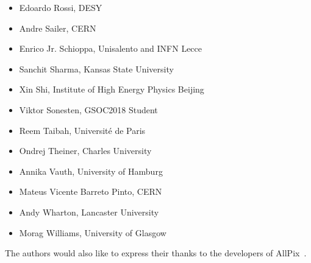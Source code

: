 \begin{itemize}
\item Edoardo Rossi, DESY
\item Andre Sailer, CERN
\item Enrico Jr. Schioppa, Unisalento and INFN Lecce
\item Sanchit Sharma, Kansas State University
\item Xin Shi, Institute of High Energy Physics Beijing
\item Viktor Sonesten, GSOC2018 Student
\item Reem Taibah, Université de Paris
\item Ondrej Theiner, Charles University
\item Annika Vauth, University of Hamburg
\item Mateus Vicente Barreto Pinto, CERN
\item Andy Wharton, Lancaster University
\item Morag Williams, University of Glasgow
\end{itemize}

The authors would also like to express their thanks to the developers of AllPix~\cite{ap1wiki,ap1git}.
